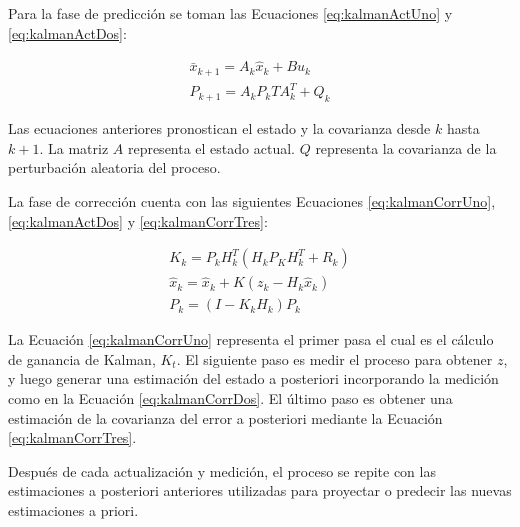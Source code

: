 Para la fase de predicción se toman las Ecuaciones \ref{eq:kalmanActUno} y \ref{eq:kalmanActDos}:

\begin{eqnarray}
    \label{eq:kalmanActUno}
    \bar{x}_{k+1} = A_k\hat{x}_k + Bu_k\\
    \label{eq:kalmanActDos}
    P_{k+1} = A_kP_kTA^{T}_k + Q_k
\end{eqnarray}


Las ecuaciones anteriores pronostican el estado y la covarianza desde $k$ hasta $k+1$. La matriz $A$ representa el estado actual. $Q$ representa la covarianza de la perturbación aleatoria del proceso.

La fase de corrección cuenta con las siguientes Ecuaciones \ref{eq:kalmanCorrUno}, \ref{eq:kalmanActDos} y \ref{eq:kalmanCorrTres}:

\begin{eqnarray}
\label{eq:kalmanCorrUno}
K_k = P_kH^{T}_k(H_kP_KH^{T}_k + R_k)\\
\label{eq:kalmanCorrDos}
\hat{x}_k = \hat{x}_k + K(z_k - H_k \hat{x}_k)\\
\label{eq:kalmanCorrTres}
P_k = (I - K_kH_k)P_k
\end{eqnarray}

La Ecuación \eqref{eq:kalmanCorrUno} representa el primer pasa el cual es el cálculo de ganancia de Kalman, $K_t$. El siguiente paso es medir el proceso para obtener $z$, y luego generar una estimación del estado a posteriori incorporando la medición como en la Ecuación \ref{eq:kalmanCorrDos}. El último paso es obtener una estimación de la covarianza del error a posteriori mediante la Ecuación \ref{eq:kalmanCorrTres}.

Después de cada actualización y medición, el proceso se repite con las estimaciones a posteriori anteriores utilizadas para proyectar o predecir las nuevas estimaciones a priori.

